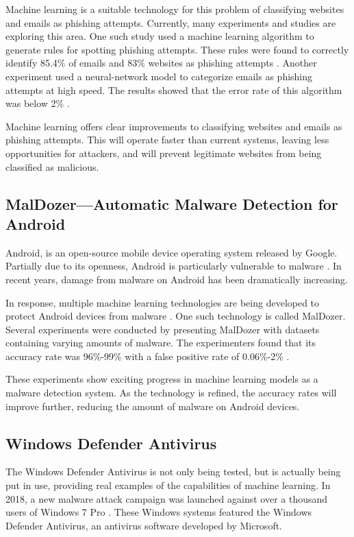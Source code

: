 Machine learning is a suitable technology for this problem of classifying websites and emails as phishing attempts.
Currently, many experiments and studies are exploring this area.
One such study used a machine learning algorithm to generate rules for spotting phishing attempts.
These rules were found to correctly identify 85.4\% of emails and 83\% websites as phishing attempts \cite{anti_phishing_techniques}.
Another experiment used a neural-network model to categorize emails as phishing attempts at high speed.
The results showed that the error rate of this algorithm was below 2\% \cite{anti_phishing_techniques}.

Machine learning offers clear improvements to classifying websites and emails as phishing attempts.
This will operate faster than current systems, leaving less opportunities for attackers, and will prevent legitimate websites from being classified as malicious.

\subsection{MalDozer---Automatic Malware Detection for Android}
Android, is an open-source mobile device operating system released by Google.
Partially due to its openness, Android is particularly vulnerable to malware \cite{sustainablecities2021}.
In recent years, damage from malware on Android has been dramatically increasing.

In response, multiple machine learning technologies are being developed to protect Android devices from malware \cite{sustainablecities2021}.
One such technology is called MalDozer.
Several experiments were conducted by presenting MalDozer with datasets containing varying amounts of malware.
The experimenters found that its accuracy rate was 96\%-99\% with a false positive rate of 0.06\%-2\% \cite{sustainablecities2021}.

These experiments show exciting progress in machine learning models as a malware detection system.
As the technology is refined, the accuracy rates will improve further, reducing the amount of malware on Android devices.

\subsection{Windows Defender Antivirus}
The Windows Defender Antivirus is not only being tested, but is actually being put in use, providing real examples of the capabilities of machine learning.
In 2018, a new malware attack campaign was launched against over a thousand users of Windows 7 Pro \cite{microsoft2018}.
These Windows systems featured the Windows Defender Antivirus, an antivirus software developed by Microsoft.

